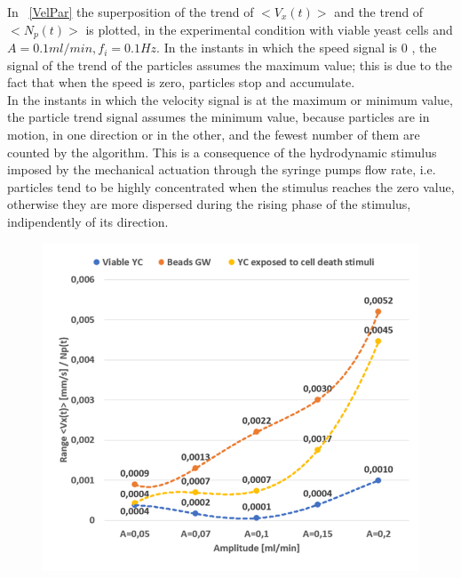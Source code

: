 \documentclass[journal]{IEEEtran}
\theoremstyle{definition}
\theoremstyle{remark}
\begin{document}
In ~\fig\ref{VelPar} the superposition of the trend of  $<V_x(t)>$ and the trend of $<N_p(t)>$ is plotted, in the experimental condition with viable yeast cells and {$A=0.1 ml/min, f_i= 0.1 Hz$}. In the instants in which the speed signal is 0 , the signal of the trend of the particles assumes the maximum value; this is due to the fact that when the speed is zero, particles stop and accumulate.
\\In the instants in which the velocity signal is at the maximum or minimum value, the particle trend signal assumes the minimum value, because particles are in motion, in one direction or in the other, and the fewest number of them are counted by the algorithm. This is a consequence of the hydrodynamic stimulus imposed by the mechanical actuation through the syringe pumps flow rate, i.e. particles tend to be highly concentrated when the stimulus reaches the zero value, otherwise they are more dispersed during the rising phase of the stimulus, indipendently of its direction. 

\begin{figure}[t]
	\centering
	\includegraphics[width=1\columnwidth]{images/Comparison}
\end{figure}
\end{document}
